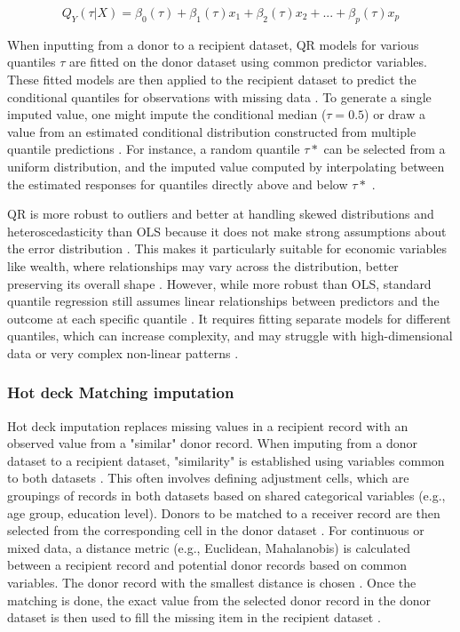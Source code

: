 $$Q_{Y}(\tau|X) = \beta_0(\tau) + \beta_1(\tau)x_1 + \beta_2(\tau)x_2 + ... + \beta_p(\tau)x_p$$

When inputting from a donor to a recipient dataset, QR models for various quantiles $\tau$ are fitted on the donor dataset using common predictor variables. These fitted models are then applied to the recipient dataset to predict the conditional quantiles for observations with missing data \citep{parker_missing}. To generate a single imputed value, one might impute the conditional median ($\tau=0.5$) or draw a value from an estimated conditional distribution constructed from multiple quantile predictions \citep{wei2014multiple}. For instance, a random quantile $\tau*$ can be selected from a uniform distribution, and the imputed value computed by interpolating between the estimated responses for quantiles directly above and below $\tau*$ \citep{chen2007confidentiality}.

QR is more robust to outliers and better at handling skewed distributions and heteroscedasticity than OLS because it does not make strong assumptions about the error distribution \citep{zhao2023quantile}. This makes it particularly suitable for economic variables like wealth, where relationships may vary across the distribution, better preserving its overall shape \citep{kleinke2020multiple}. However, while more robust than OLS, standard quantile regression still assumes linear relationships between predictors and the outcome at each specific quantile \citep{meinshausen2006quantile}. It requires fitting separate models for different quantiles, which can increase complexity, and may struggle with high-dimensional data or very complex non-linear patterns \citep{meinshausen2006quantile}.

\subsubsection{Hot deck Matching imputation}

Hot deck imputation replaces missing values in a recipient record with an observed value from a "similar" donor record. When imputing from a donor dataset to a recipient dataset, "similarity" is established using variables common to both datasets \citep{dorazio2021statistical}. This often involves defining adjustment cells, which are groupings of records in both datasets   
based on shared categorical variables (e.g., age group, education level). Donors to be matched to a receiver record are then selected from the corresponding cell in the donor dataset \citep{chen2000nearest}. For continuous or mixed data, a distance metric (e.g., Euclidean, Mahalanobis) is calculated between a recipient record and potential donor records based on common variables. The donor record with the smallest distance is chosen \citep{dorazio2021statistical}. Once the matching is done, the exact value from the selected donor record in the donor dataset is then used to fill the missing item in the recipient dataset \citep{andridge2010review}.

